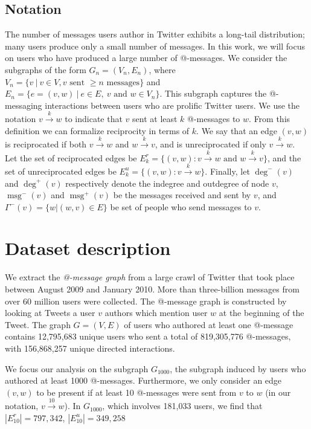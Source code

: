 \documentclass[conference]{IEEEtran}
\begin{document}
\subsection{Notation}
The number of messages users author in Twitter exhibits a long-tail distribution; many users produce only a small number of messages.
In this work, we will focus on users who have produced a large number of @-messages.
We consider the subgraphs of the form $G_n = (V_n, E_n)$, where $V_n = \{v~|~v \in V, v \text{ sent } \ge n \text{ messages}\}$ and $E_n = \{e=(v,w)~|~e \in E,~v \text{ and } w \in V_n\}$.
This subgraph captures the @-messaging interactions between users who are prolific Twitter users.
We use the notation $v \xrightarrow{k} w$ to indicate that $v$ sent at least $k$ @-messages to $w$. 
From this definition we can formalize reciprocity in terms of $k$. 
We say that an edge $(v,w)$ is reciprocated if both $v \xrightarrow{k} w$ and $w \xrightarrow{k} v$, and is unreciprocated if only $v \xrightarrow{k} w$.
Let the set of reciprocated edges be \(E_k^r = \{ (v,w) : v \xrightarrow{k} w \text{ and } w \xrightarrow{k} v \} \), and the set of unreciprocated edges be \(E_k^u = \{ (v,w) : v \xrightarrow{k} w\}\).
Finally, let $\deg^-(v)$ and $\deg^+(v)$ respectively denote the indegree and outdegree of node $v$, $\operatorname{msg}^-(v)$ and $\operatorname{msg}^+(v)$ be the messages received and sent by $v$, and $\Gamma^-(v) = \{w| (w,v) \in E\}$ be set of people who send messages to $v$.

\section{Dataset description}
We extract the \emph{@-message graph} from a large crawl of Twitter that took place between August 2009 and January 2010.
More than three-billion messages from over 60 million users were collected.  
The @-message graph is constructed by looking at Tweets a user $v$ authors which mention user $w$ at the beginning of the Tweet.  
The graph $G = (V,E)$ of users who authored at least one @-message contains 12,795,683 unique users who sent a total of 819,305,776 @-messages, with 156,868,257 unique directed interactions. 

We focus our analysis on the subgraph $G_{1000}$, the subgraph induced by users who authored at least 1000 @-messages. 
Furthermore, we only consider an edge $(v,w)$ to be present if at least 10 @-messages were sent from $v$ to $w$ (in our notation, $v \xrightarrow{10} w$).
In $G_{1000}$, which involves 181,033 users, we find that $|E^r_{10}| = 797,342$, $|E^u_{10}| = 349,258$
\end{document}
